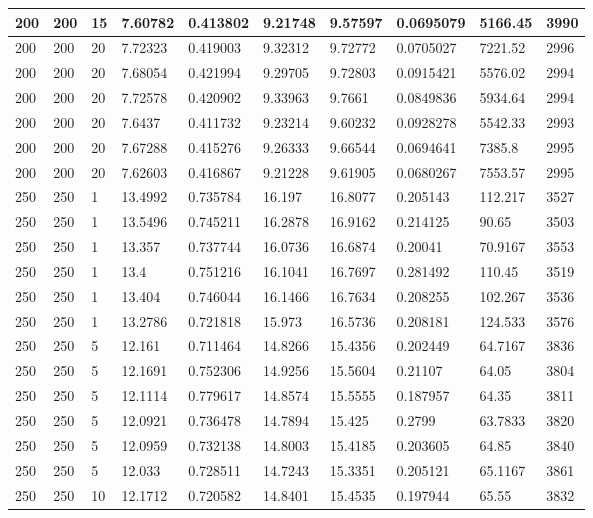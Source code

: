 \begin{landscape}
\begin{longtable}{ | l | l | l | l | l | l | l | l | l | l | }
200 & 200 & 15 & 7.60782 & 0.413802 & 9.21748 & 9.57597 & 0.0695079 & 5166.45 & 3990\\ \hline
200 & 200 & 20 & 7.72323 & 0.419003 & 9.32312 & 9.72772 & 0.0705027 & 7221.52 & 2996\\ \hline
200 & 200 & 20 & 7.68054 & 0.421994 & 9.29705 & 9.72803 & 0.0915421 & 5576.02 & 2994\\ \hline
200 & 200 & 20 & 7.72578 & 0.420902 & 9.33963 & 9.7661 & 0.0849836 & 5934.64 & 2994\\ \hline
200 & 200 & 20 & 7.6437 & 0.411732 & 9.23214 & 9.60232 & 0.0928278 & 5542.33 & 2993\\ \hline
200 & 200 & 20 & 7.67288 & 0.415276 & 9.26333 & 9.66544 & 0.0694641 & 7385.8 & 2995\\ \hline
200 & 200 & 20 & 7.62603 & 0.416867 & 9.21228 & 9.61905 & 0.0680267 & 7553.57 & 2995\\ \hline
250 & 250 & 1 & 13.4992 & 0.735784 & 16.197 & 16.8077 & 0.205143 & 112.217 & 3527\\ \hline
250 & 250 & 1 & 13.5496 & 0.745211 & 16.2878 & 16.9162 & 0.214125 & 90.65 & 3503\\ \hline
250 & 250 & 1 & 13.357 & 0.737744 & 16.0736 & 16.6874 & 0.20041 & 70.9167 & 3553\\ \hline
250 & 250 & 1 & 13.4 & 0.751216 & 16.1041 & 16.7697 & 0.281492 & 110.45 & 3519\\ \hline
250 & 250 & 1 & 13.404 & 0.746044 & 16.1466 & 16.7634 & 0.208255 & 102.267 & 3536\\ \hline
250 & 250 & 1 & 13.2786 & 0.721818 & 15.973 & 16.5736 & 0.208181 & 124.533 & 3576\\ \hline
250 & 250 & 5 & 12.161 & 0.711464 & 14.8266 & 15.4356 & 0.202449 & 64.7167 & 3836\\ \hline
250 & 250 & 5 & 12.1691 & 0.752306 & 14.9256 & 15.5604 & 0.21107 & 64.05 & 3804\\ \hline
250 & 250 & 5 & 12.1114 & 0.779617 & 14.8574 & 15.5555 & 0.187957 & 64.35 & 3811\\ \hline
250 & 250 & 5 & 12.0921 & 0.736478 & 14.7894 & 15.425 & 0.2799 & 63.7833 & 3820\\ \hline
250 & 250 & 5 & 12.0959 & 0.732138 & 14.8003 & 15.4185 & 0.203605 & 64.85 & 3840\\ \hline
250 & 250 & 5 & 12.033 & 0.728511 & 14.7243 & 15.3351 & 0.205121 & 65.1167 & 3861\\ \hline
250 & 250 & 10 & 12.1712 & 0.720582 & 14.8401 & 15.4535 & 0.197944 & 65.55 & 3832\\ \hline

\end{longtable}
\end{landscape}

